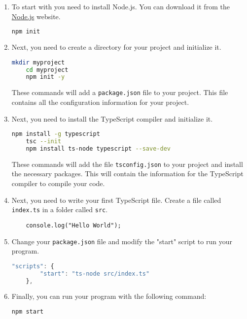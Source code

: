 \documentclass[12pt]{book}
\begin{document}
\begin{enumerate}

\item 
To start with you need to install Node.js. You can download it from the
\href{https://nodejs.org}{Node.js} website.

\begin{lstlisting}[language=bash]
    npm init
\end{lstlisting}

\item Next, you need to create a directory for your project and initialize it.

\begin{lstlisting}[language=bash]
    mkdir myproject
    cd myproject
    npm init -y
\end{lstlisting}

These commands will add a \texttt{package.json} file to your project. This file
contains all the configuration information for your project.

\item Next, you need to install the TypeScript compiler and initialize it.

\begin{lstlisting}[language=bash]
    npm install -g typescript
    tsc --init
    npm install ts-node typescript --save-dev
\end{lstlisting}

These commands will add the file \texttt{tsconfig.json} to your project and
install the necessary packages. This will contain the information for the
TypeScript compiler to compile your code.

\item Next, you need to write your first TypeScript file. Create a file called
\texttt{index.ts} in a folder called \texttt{src}.

\begin{lstlisting}
    console.log("Hello World");
\end{lstlisting}

\item Change your \texttt{package.json} file and modify the "start" script to run your program.

\begin{lstlisting}[language=JavaScript]
    "scripts": {
        "start": "ts-node src/index.ts"
    },
\end{lstlisting}

\item Finally, you can run your program with the following command:

\begin{lstlisting}[language=bash]
    npm start
\end{lstlisting}

\end{enumerate}
\end{document}
